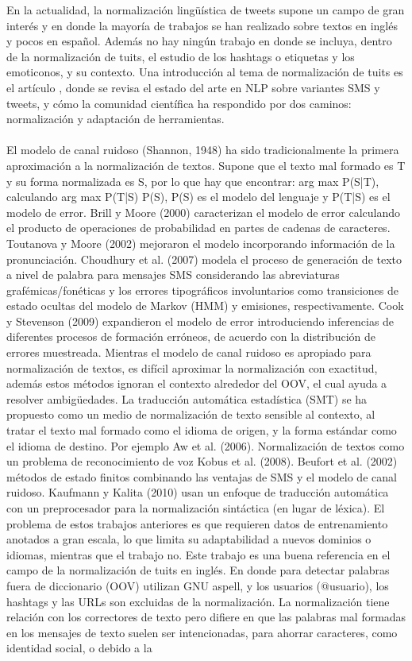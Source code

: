 \documentclass[14pt]{extarticle}
\theoremstyle{definition}
\theoremstyle{remark}
\begin{document}
En la actualidad, la normalización lingüística de tweets \citep{baldwin:2011} supone un campo de gran interés y en donde la mayoría de trabajos se han realizado sobre textos en inglés y pocos en español. Además no hay ningún trabajo en donde se incluya, dentro de la normalización de tuits, el estudio de los hashtags o etiquetas y los emoticonos, y su contexto. 
Una introducción al tema de normalización de tuits es el artículo \citep{eisenstein:2013}, donde se revisa el estado del arte en NLP sobre variantes SMS y tweets, y cómo la comunidad científica ha respondido por dos caminos: normalización y adaptación de herramientas.\\\\
El modelo de canal ruidoso (Shannon, 1948) ha sido tradicionalmente la primera aproximación a la normalización de textos. Supone que el texto mal formado es T y su forma normalizada es S, por lo que hay que encontrar: arg max P(S|T), calculando arg max P(T|S) P(S), P(S) es el modelo del lenguaje y P(T|S) es el modelo de error. Brill y Moore (2000) caracterizan el modelo de error calculando el producto de operaciones de probabilidad en partes de cadenas de caracteres. Toutanova y Moore (2002) mejoraron el modelo incorporando información de la pronunciación. Choudhury et al. (2007) modela el proceso de generación de texto a nivel de palabra para mensajes SMS considerando las abreviaturas grafémicas/fonéticas y los errores tipográficos involuntarios como transiciones de estado ocultas del modelo de Markov (HMM) y emisiones, respectivamente. Cook y Stevenson (2009) expandieron el modelo de error introduciendo inferencias de diferentes procesos de formación erróneos, de acuerdo con la distribución de errores muestreada. Mientras el modelo de canal ruidoso es apropiado para normalización de textos, es difícil aproximar la normalización con exactitud, además estos métodos ignoran el contexto alrededor del OOV, el cual ayuda a resolver ambigüedades. La traducción automática estadística (SMT) se ha propuesto como un medio de normalización de texto sensible al contexto, al tratar el texto mal formado como el idioma de origen, y la forma estándar como el idioma de destino. Por ejemplo Aw et al. (2006). Normalización de textos como un problema de reconocimiento de voz Kobus et al. (2008). Beufort et al. (2002) métodos de estado finitos combinando las ventajas de SMS y el modelo de canal ruidoso. Kaufmann y Kalita (2010) usan un enfoque de traducción automática con un preprocesador para la normalización sintáctica (en lugar de léxica). El problema de estos trabajos anteriores es que requieren datos de entrenamiento anotados a gran escala, lo que limita su adaptabilidad a nuevos dominios o idiomas, mientras que el trabajo \citep{baldwin:2011} no. Este trabajo es una buena referencia en el campo de la normalización de tuits en inglés. En donde para detectar palabras fuera de diccionario (OOV) utilizan GNU aspell, y los usuarios (@usuario), los hashtags y las URLs son excluidas de la normalización. La normalización tiene relación con los correctores de texto \citep{peterson:1980} pero difiere en que las palabras mal formadas en los mensajes de texto suelen ser intencionadas, para ahorrar caracteres, como identidad social, o debido a la 
\end{document}
